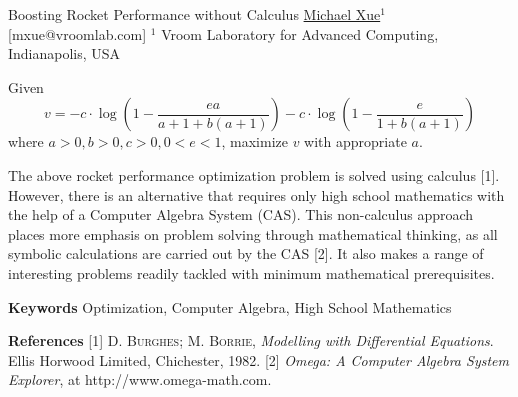 


\begin{abstract_online}{Boosting Rocket Performance without Calculus}{%
        \underline{Michael Xue}$^{1}$}{[mxue@vroomlab.com]
        }{%
        $^1$ Vroom Laboratory for Advanced Computing, Indianapolis, USA\newline{}}
    
Given \[v = -c\cdot\log(1-\frac{ea}{a+1+b(a+1)})-c\cdot\log(1-\frac{e}{1+b(a+1)})\] where $a>0, b>0, c>0, 0<e<1$, maximize $v$ with appropriate $a$. \newline{}

The above rocket performance optimization problem is solved using calculus [1]. However, there is an alternative that requires only high school 
mathematics with the help of a Computer Algebra System (CAS). This non-calculus approach places more emphasis on problem solving 
through mathematical thinking, as all symbolic calculations are carried out by the CAS [2]. It also makes a range 
of interesting problems readily tackled with minimum mathematical prerequisites.

\textbf{Keywords} \newline{} Optimization, Computer Algebra, High School Mathematics

\textbf{References} \newline{}
[1] \textsc{D. Burghes; M. Borrie}, \emph{Modelling with Differential Equations}. Ellis Horwood Limited, Chichester, 1982. \newline{}
[2] \emph{Omega: A Computer Algebra System Explorer}, at http://www.omega-math.com. \newline{}
    
\end{abstract_online}
